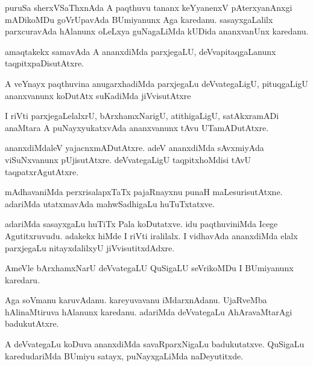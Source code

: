 \documentclass{article}
\begin{document}
\begin{mn}
puruSa sherxVSaThxnAda A paqthuvu tananx keYyanenxV pAterxyanAnxgi mADikoMDu 
goVrUpavAda BUmiyanunx Aga karedanu. sasayxgaLalilx parxcuravAda hAlanunx 
oLeLxya guNagaLiMda kUDida ananxvanUnx karedanu. 
\end{mn}

\begin{mn}
amaqtakekx samavAda A ananxdiMda parxjegaLU, deVvapitaqgaLanunx taqpitxpaDisutAtxre.
\end{mn}

\begin{mn}
A veYnayx paqthuvina anugarxhadiMda parxjegaLu deVvategaLigU, pituqgaLigU 
ananxvanunx koDutAtx suKadiMda jiVvisutAtxre
\end{mn}

\begin{mn}
 I riVti parxjegaLelalxrU, bArxhamxNarigU, atithigaLigU, satAkxramADi 
 anaMtara A puNayxyukatxvAda ananxvanunx tAvu UTamADutAtxre.
\end{mn}

\begin{mn}
ananxdiMdaleV yajacnxmADutAtxre.  adeV ananxdiMda sAvxmiyAda viSuNxvanunx 
pUjisutAtxre.  deVvategaLigU taqpitxhoMdisi tAvU taqpatxrAgutAtxre.
\end{mn}

\begin{mn}
mAdhavaniMda perxrisalapxTaTx pajaRnayxnu punaH maLesurisutAtxne. 
adariMda utatxmavAda mahwSadhigaLu huTuTxtatxve. 
\end{mn}

\begin{mn}
adariMda sasayxgaLu huTiTx Pala koDutatxve.  idu paqthuviniMda Icege 
Agutitxruvudu. adakekx hiMde I riVti iralilalx.  I vidhavAda ananxdiMda 
elalx parxjegaLu nitayxdalilxyU jiVvisutitxdAdxre.
\end{mn}

\begin{mn}
AmeVle bArxhamxNarU deVvategaLU QuSigaLU seVrikoMDu I BUmiyanunx karedaru. 
\end{mn}

\begin{mn}
Aga soVmanu karuvAdanu. kareyuvavanu iMdarxnAdanu.  UjaRveMba hAlinaMtiruva 
hAlanunx karedanu.  adariMda deVvategaLu AhAravaMtarAgi badukutAtxre. 
\end{mn}

\begin{mn}
A deVvategaLu koDuva ananxdiMda savaRparxNigaLu badukutatxve. QuSigaLu 
karedudariMda BUmiyu satayx, puNayxgaLiMda naDeyutitxde.
\end{mn}
\end{document}
